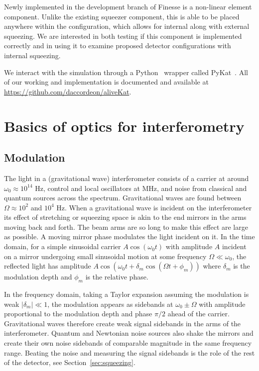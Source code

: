 \documentclass[aps,pra,superscriptaddress,reprint,nofootinbib]{revtex4-1}
\newcommand{\abs}[1]{\left\lvert #1 \right\rvert}
\begin{document}
Newly implemented in the development branch of Finesse is a non-linear element component. Unlike the existing squeezer component, this is able to be placed anywhere within the configuration, which allows for internal along with external squeezing. We are interested in both testing if this component is implemented correctly and in using it to examine proposed detector configurations with internal squeezing.


We interact with the simulation through a Python~\cite{python} wrapper called PyKat~\cite{finesse}. All of our working and implementation is documented and available at \url{https://github.com/daccordeon/aliveKat}.


\section{Basics of optics for interferometry}
\label{sec:basics}

\subsection{Modulation}

The light in a (gravitational wave) interferometer consists of a carrier at around $\omega_0 \approx 10^{14}$ Hz, control and local oscillators at MHz, and noise from classical and quantum sources across the spectrum. Gravitational waves are found between $\Omega \approx 10^2$ and $10^4$ Hz. When a gravitational wave is incident on the interferometer its effect of stretching or squeezing space is akin to the end mirrors in the arms moving back and forth. The beam arms are so long to make this effect are large as possible. A moving mirror phase modulates the light incident on it. In the time domain, for a simple sinusoidal carrier $A \cos(\omega_0 t)$ with amplitude $A$ incident on a mirror undergoing small sinusoidal motion at some frequency $\Omega \ll \omega_0$, the reflected light has amplitude $A \cos(\omega_0 t + \delta_m \cos(\Omega t + \phi_m))$ where $\delta_m$ is the modulation depth and $\phi_m$ is the relative phase.


In the frequency domain, taking a Taylor expansion assuming the modulation is weak $\abs{\delta_m} \ll 1$, the modulation appears as sidebands at $\omega_0 \pm \Omega$ with amplitude proportional to the modulation depth and phase $\pi/2$ ahead of the carrier. Gravitational waves therefore create weak signal sidebands in the arms of the interferometer. Quantum and Newtonian noise sources also shake the mirrors and create their own noise sidebands of comparable magnitude in the same frequency range. Beating the noise and measuring the signal sidebands is the role of the rest of the detector, see Section~\ref{sec:squeezing}.
\end{document}
